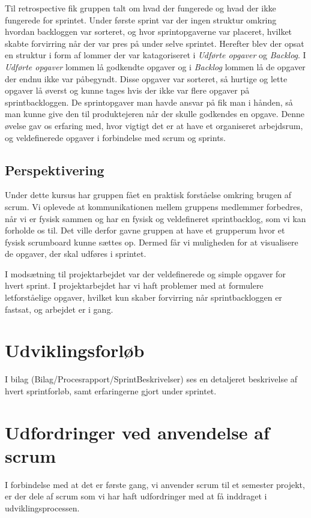 \noindent Til retrospective fik gruppen talt om hvad der fungerede og hvad der ikke fungerede for sprintet. Under første sprint var der ingen struktur omkring hvordan backloggen var sorteret, og hvor sprintopgaverne var placeret, hvilket skabte forvirring når der var pres på under selve sprintet. Herefter blev der opsat en struktur i form af lommer der var katagoriseret i \textit{Udførte opgaver} og \textit{Backlog}. I \textit{Udførte opgaver} lommen lå godkendte opgaver og i \textit{Backlog} lommen lå de opgaver der endnu ikke var påbegyndt. Disse opgaver var sorteret, så hurtige og lette opgaver lå øverst og kunne tages hvis der ikke var flere opgaver på sprintbackloggen. De sprintopgaver man havde ansvar på fik man i hånden, så man kunne give den til produktejeren når der skulle godkendes en opgave. \newline
Denne øvelse gav os erfaring med, hvor vigtigt det er at have et organiseret arbejdsrum, og veldefinerede opgaver i forbindelse med scrum og sprints.

\section{Perspektivering}
Under dette kursus har gruppen fået en praktisk forståelse omkring brugen af scrum. Vi oplevede at kommunikationen mellem gruppens medlemmer forbedres, når vi er fysisk sammen og har en fysisk og veldefineret sprintbacklog, som vi kan forholde os til. Det ville derfor gavne gruppen at have et grupperum hvor et fysisk scrumboard kunne sættes op. Dermed får vi muligheden for at visualisere de opgaver, der skal udføres i sprintet. \newline

\noindent I modsætning til projektarbejdet var der veldefinerede og simple opgaver for hvert sprint. I projektarbejdet har vi haft problemer med at formulere letforståelige opgaver, hvilket kun skaber forvirring når sprintbackloggen er fastsat, og arbejdet er i gang.\newline

\chapter{Udviklingsforløb}
I bilag (Bilag/Procesrapport/SprintBeskrivelser) ses en detaljeret beskrivelse af hvert sprintforløb, samt erfaringerne gjort under sprintet.

\chapter{Udfordringer ved anvendelse af scrum}
I forbindelse med at det er første gang, vi anvender scrum til et semester projekt, er der dele af scrum som vi har haft udfordringer med at få inddraget i udviklingsprocessen.

